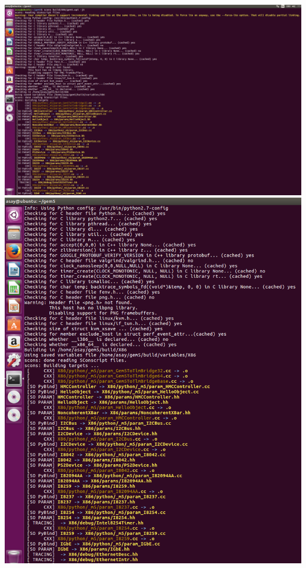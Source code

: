 \documentclass{article}
\begin{document}
\begin{center}
	\includegraphics[width=1\textwidth]{build27}
	\includegraphics[width=1\textwidth]{build26}

\end{center}
\end{document}
